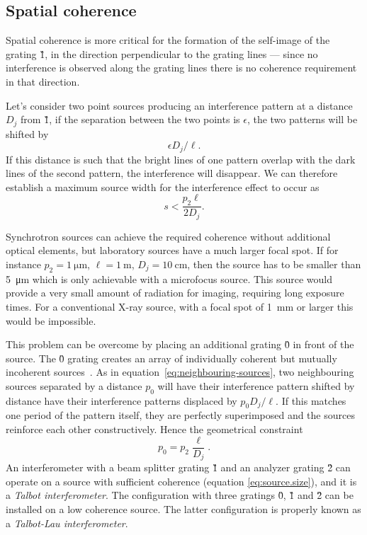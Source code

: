 \subsection{Spatial coherence}\label{sec:coherence}
Spatial coherence is more critical for the formation of the self-image of
the grating \G1, in the direction perpendicular to the grating lines --- since no
interference is observed along the grating lines there
is no coherence requirement in that direction.

Let's consider two point sources producing an interference pattern at a
distance $D_j$ from \G1, if the separation between the two points is
$\epsilon$, the two patterns will be shifted by 
\begin{equation}
    \epsilon D_j / \ell.
    \label{eq:neighbouring-sources}
\end{equation}
If this distance is such that the bright lines of one pattern
overlap with the dark lines of the second pattern, the interference will
disappear. We can therefore establish a maximum source width for the
interference effect to occur as
\begin{equation}
    s < \frac{p_2\ell}{2D_j}.
    \label{eq:source.size}
\end{equation}

Synchrotron sources can achieve the required coherence without additional
optical elements, but laboratory sources have a much larger focal spot. If
for instance $p_2 = \SI{1}{\micro\meter}$, $\ell = \SI{1}{\meter}$, $D_j = \SI{10}{\centi\meter}$, then
the source has to be smaller than \SI{5}{\micro\meter} which is only
achievable with a microfocus source. This source would provide a very small
amount of radiation for imaging, requiring long exposure times.
For a conventional X-ray source, with a focal spot of \SI{1}{\milli\meter}
or larger this would be impossible.

This problem can be overcome by placing an additional grating \G0 in front
of the source. The \G0 grating creates an array of individually coherent but
mutually incoherent sources~\parencite{Pfeiffer2006}. As in equation~\eqref{eq:neighbouring-sources},
two neighbouring sources separated by a distance $p_0$ will have their
interference pattern shifted by 
distance have their
interference patterns displaced by $p_0 D_j / \ell$. If this matches one
period of the pattern itself, they are perfectly superimposed and the
sources reinforce each other constructively. Hence the geometrical
constraint
\begin{equation}
    p_0 = p_2 \frac{\ell}{D_j}.\label{eq:p0}
\end{equation}
An interferometer with a beam splitter grating \G1 and an analyzer grating
\G2 can operate on a source with sufficient coherence (equation
\ref{eq:source.size}), and it is a \emph{Talbot interferometer}.
The configuration with three gratings \G0, \G1 and \G2 can be installed on a
low coherence source. The latter configuration is properly known as a
\emph{Talbot-Lau interferometer}.

